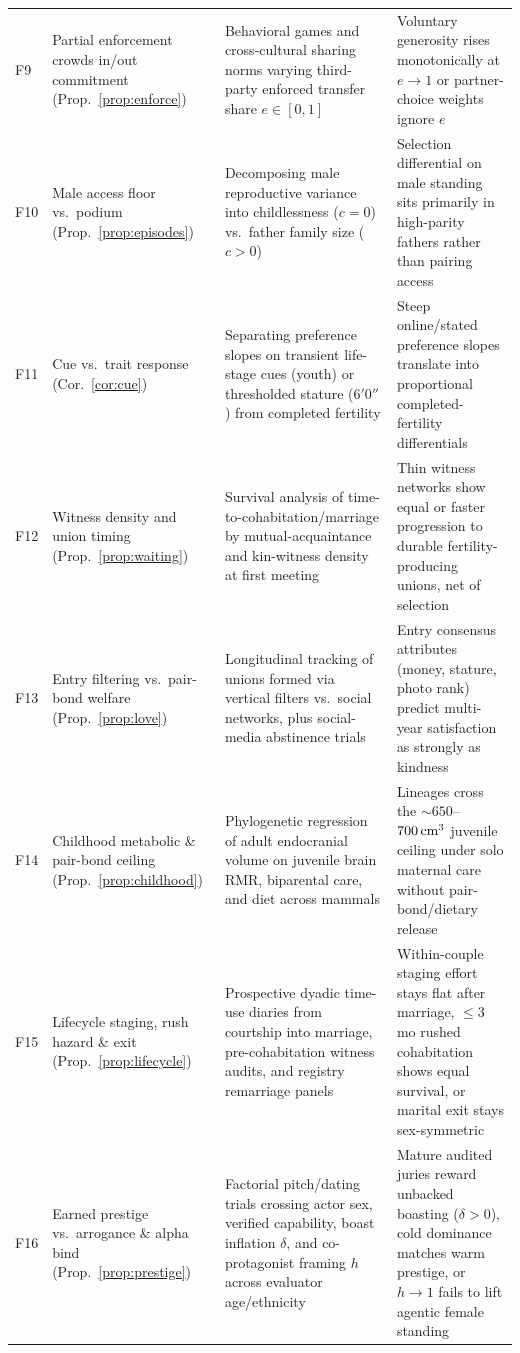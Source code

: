 \begin{table}[!t]
\begin{tabularx}{\textwidth}{@{}l>{\raggedright\arraybackslash}p{}LL@{}}
F9 & Partial enforcement crowds in/out commitment (Prop.~\ref{prop:enforce}) & Behavioral games and cross-cultural sharing norms varying third-party enforced transfer share $e\in[0,1]$ & Voluntary generosity rises monotonically at $e\to 1$ or partner-choice weights ignore $e$ \\
F10 & Male access floor vs.\ podium (Prop.~\ref{prop:episodes}) & Decomposing male reproductive variance into childlessness ($c=0$) vs.\ father family size ($c>0$) & Selection differential on male standing sits primarily in high-parity fathers rather than pairing access \\
F11 & Cue vs.\ trait response (Cor.~\ref{cor:cue}) & Separating preference slopes on transient life-stage cues (youth) or thresholded stature ($6'0''$) from completed fertility & Steep online/stated preference slopes translate into proportional completed-fertility differentials \\
F12 & Witness density and union timing (Prop.~\ref{prop:waiting}) & Survival analysis of time-to-cohabitation/marriage by mutual-acquaintance and kin-witness density at first meeting & Thin witness networks show equal or faster progression to durable fertility-producing unions, net of selection \\
F13 & Entry filtering vs.\ pair-bond welfare (Prop.~\ref{prop:love}) & Longitudinal tracking of unions formed via vertical filters vs.\ social networks, plus social-media abstinence trials & Entry consensus attributes (money, stature, photo rank) predict multi-year satisfaction as strongly as kindness \\
F14 & Childhood metabolic \& pair-bond ceiling (Prop.~\ref{prop:childhood}) & Phylogenetic regression of adult endocranial volume on juvenile brain RMR, biparental care, and diet across mammals & Lineages cross the $\sim\!650$--$700\,\text{cm}^3$ juvenile ceiling under solo maternal care without pair-bond/dietary release \\
F15 & Lifecycle staging, rush hazard \& exit (Prop.~\ref{prop:lifecycle}) & Prospective dyadic time-use diaries from courtship into marriage, pre-cohabitation witness audits, and registry remarriage panels & Within-couple staging effort stays flat after marriage, $\le 3$\,mo rushed cohabitation shows equal survival, or marital exit stays sex-symmetric \\
F16 & Earned prestige vs.\ arrogance \& alpha bind (Prop.~\ref{prop:prestige}) & Factorial pitch/dating trials crossing actor sex, verified capability, boast inflation $\delta$, and co-protagonist framing $h$ across evaluator age/ethnicity & Mature audited juries reward unbacked boasting ($\delta>0$), cold dominance matches warm prestige, or $h\to 1$ fails to lift agentic female standing \\

\end{tabularx}
\end{table}
